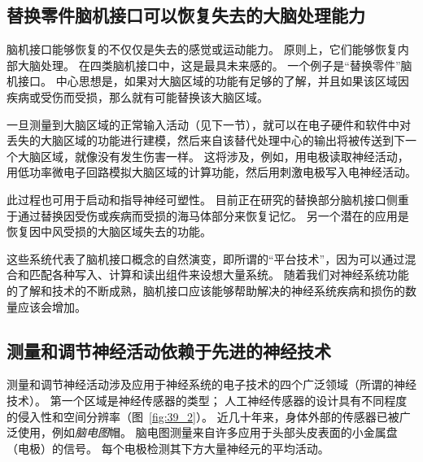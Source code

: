 \subsection{替换零件脑机接口可以恢复失去的大脑处理能力}

脑机接口能够恢复的不仅仅是失去的感觉或运动能力。
原则上，它们能够恢复内部大脑处理。
在四类脑机接口中，这是最具未来感的。
一个例子是“替换零件”脑机接口。
中心思想是，如果对大脑区域的功能有足够的了解，并且如果该区域因疾病或受伤而受损，那么就有可能替换该大脑区域。


一旦测量到大脑区域的正常输入活动（见下一节），就可以在电子硬件和软件中对丢失的大脑区域的功能进行建模，然后来自该替代处理中心的输出将被传送到下一个大脑区域，就像没有发生伤害一样。
这将涉及，例如，用电极读取神经活动，用低功率微电子回路模拟大脑区域的计算功能，然后用刺激电极写入电神经活动。


此过程也可用于启动和指导神经可塑性。
目前正在研究的替换部分脑机接口侧重于通过替换因受伤或疾病而受损的海马体部分来恢复记忆。
另一个潜在的应用是恢复因中风受损的大脑区域失去的功能。


这些系统代表了脑机接口概念的自然演变，即所谓的“平台技术”，因为可以通过混合和匹配各种写入、计算和读出组件来设想大量系统。
随着我们对神经系统功能的了解和技术的不断成熟，脑机接口应该能够帮助解决的神经系统疾病和损伤的数量应该会增加。



\subsection{测量和调节神经活动依赖于先进的神经技术}

测量和调节神经活动涉及应用于神经系统的电子技术的四个广泛领域（所谓的神经技术）。
第一个区域是神经传感器的类型；
人工神经传感器的设计具有不同程度的侵入性和空间分辨率（图~\ref{fig:39_2}）。
近几十年来，身体外部的传感器已被广泛使用，例如\textit{脑电图}帽。
脑电图测量来自许多应用于头部头皮表面的小金属盘（电极）的信号。
每个电极检测其下方大量神经元的平均活动。


